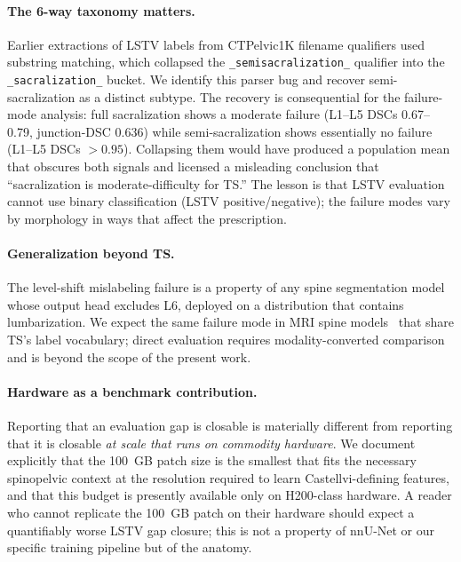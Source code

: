 \documentclass{article}
\begin{document}
\paragraph{The 6-way taxonomy matters.}
Earlier extractions of LSTV labels from CTPelvic1K filename
qualifiers used substring matching, which collapsed the
\texttt{\_semisacralization\_} qualifier into the
\texttt{\_sacralization\_} bucket.
We identify this parser bug and recover semi-sacralization as a
distinct subtype.
The recovery is consequential for the failure-mode analysis: full
sacralization shows a moderate failure (L1--L5 DSCs 0.67--0.79,
junction-DSC 0.636) while semi-sacralization shows essentially no
failure (L1--L5 DSCs $>0.95$).
Collapsing them would have produced a population mean that
obscures both signals and licensed a misleading conclusion that
``sacralization is moderate-difficulty for TS.''
The lesson is that LSTV evaluation cannot use binary
classification (LSTV positive/negative); the failure modes vary
by morphology in ways that affect the prescription.

\paragraph{Generalization beyond TS.}
The level-shift mislabeling failure is a property of any spine
segmentation model whose output head excludes L6, deployed on a
distribution that contains lumbarization.
We expect the same failure mode in MRI spine
models~\citep{Warszawer2025TotalSpineSeg:MRI,GraafSPIDERBenchmark}
that share TS's label vocabulary;
direct evaluation requires modality-converted comparison and is
beyond the scope of the present work.

\paragraph{Hardware as a benchmark contribution.}
Reporting that an evaluation gap is closable is materially
different from reporting that it is closable \emph{at scale that
runs on commodity hardware}.
We document explicitly that the 100~GB patch size is the smallest
that fits the necessary spinopelvic context at the resolution
required to learn Castellvi-defining features, and that this
budget is presently available only on H200-class hardware.
A reader who cannot replicate the 100~GB patch on their hardware
should expect a quantifiably worse LSTV gap closure;
this is not a property of nnU-Net or our specific training
pipeline but of the anatomy.
\end{document}
